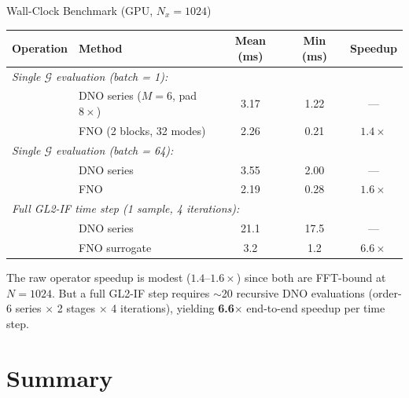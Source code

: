 \documentclass[aspectratio=169,11pt]{beamer}
\newcommand{\Gop}{\mathcal{G}}
\begin{document}
\begin{frame}{Wall-Clock Benchmark (GPU, $N_x = 1024$)}
\small{
\begin{center}
\begin{tabular}{llccc}
\toprule
Operation & Method & Mean (ms) & Min (ms) & Speedup \\
\midrule
\multicolumn{5}{l}{\textit{Single $\Gop$ evaluation (batch = 1):}} \\
& DNO series ($M\!=\!6$, pad $8\times$) & 3.17 & 1.22 & --- \\
& FNO (2 blocks, 32 modes)              & 2.26 & 0.21 & $1.4\times$ \\
\midrule
\multicolumn{5}{l}{\textit{Single $\Gop$ evaluation (batch = 64):}} \\
& DNO series & 3.55 & 2.00 & --- \\
& FNO        & 2.19 & 0.28 & $1.6\times$ \\
\midrule
\multicolumn{5}{l}{\textit{Full GL2-IF time step (1 sample, 4 iterations):}} \\
& DNO series & 21.1 & 17.5 & --- \\
& FNO surrogate & 3.2 & 1.2 & $\mathbf{6.6\times}$ \\
\bottomrule
\end{tabular}
\end{center}


The raw operator speedup is modest ($1.4$--$1.6\times$) since both are FFT-bound at $N = 1024$. But a full GL2-IF step requires $\sim$20 recursive DNO evaluations (order-6 series $\times$ 2 stages $\times$ 4 iterations), yielding \textbf{6.6$\times$} end-to-end speedup per time step.
}
\end{frame}

\section{Summary}
\end{document}

